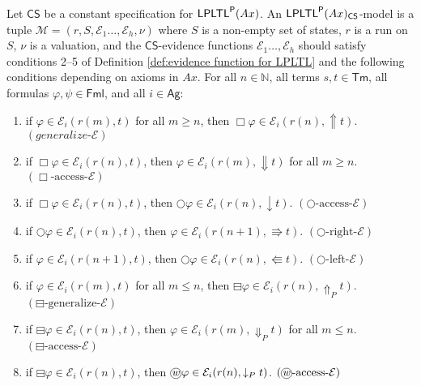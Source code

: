 \documentclass[envcountsect,envcountsame,oribibl,orivec]{llncs}
\newcommand*\circled[1]{\tikz[baseline=(char.base)]{
		\node[shape=circle,draw,inner sep=0.4pt] (char) {#1};}}
\newcommand{\Formulae}{\textsf{Fml}}
\newcommand{\lnext}{\bigcirc}
\newcommand{\lalways}{\Box}
\newcommand{\lsofar}{\boxminus}
\newcommand{\wprevious}{\circled{\textit{w}}}
\newcommand{\LPLTLp}{\textsf{LPLTL}^{\sf P}}
\newcommand{\Terms}{\textsf{Tm}}
\newcommand{\Ag}{\textsf{Ag}}
\newcommand{\tnext}{\Rrightarrow}
\newcommand{\tprev}{\Lleftarrow}
\newcommand{\talwaysaccess}{\Downarrow}
\newcommand{\tgeneralize}{\Uparrow}
\newcommand{\tnextaccess}{\downarrow}
\newcommand{\thenceforthaccess}{\Downarrow_P}
\newcommand{\thenceforthgeneralize}{\Uparrow_P}
\newcommand{\tprevaccess}{\downarrow_P}
\newcommand{\CS}{\textsf{CS}}
\newcommand{\numberofagents}{h}
\newcommand{\agent}{i}
\newcommand{\generalizeevidence}{\ensuremath{(generalize\text{-}\evidence)}}
\newcommand{\alwaysaccessevidence}{\ensuremath{(\lalways\text{-access-}\evidence)}}
\newcommand{\nextaccessevidence}{\ensuremath{(\lnext\text{-access-}\evidence)}}
\newcommand{\nextrightshiftevidence}{\ensuremath{(\lnext\text{-right-}\evidence)}}
\newcommand{\nextleftshiftevidence}{\ensuremath{(\lnext\text{-left-}\evidence)}}
\newcommand{\pastgeneralizeevidence}{\ensuremath{(\lsofar\text{-generalize-}\evidence)}}
\newcommand{\pastaccessevidence}{\ensuremath{(\lsofar\text{-access-}\evidence)}}
\newcommand{\wprevaccessevidence}{\ensuremath{(\wprevious\text{-access-}\evidence)}}
\newcommand{\evidence}{\mathcal{E}}
\newcommand{\valuation}{\nu}
\newcommand{\M}{\mathcal{M}}
\newcommand{\N}{\mathbb{N}}
\renewcommand{\phi}{\varphi}
\begin{document}
\begin{definition}\label{def: evidence functions M-models aditional principles}
Let $\CS$ be a constant specification for $\LPLTLp(Ax)$. An \linebreak $\LPLTLp(Ax)_\CS$-model   is a tuple $
\M = (r, S, \evidence_1\ldots,\evidence_\numberofagents, \valuation)
$
where $S$ is a non-empty set of states, $r$ is a run on $S$, $\valuation$ is a valuation, and the $\CS$-evidence functions $\evidence_1\ldots,\evidence_\numberofagents$ should
	satisfy conditions 2--5 of Definition \ref{def:evidence function for LPLTL} and the following conditions depending on axioms in $Ax$.
	For all $n \in \N$, all terms $s,t \in \Terms$, all formulas $\phi,\psi \in \Formulae$, and all $i \in \Ag$:
	\begin{enumerate}
		\item if $\phi \in \evidence_\agent(r(m), t)$ for all $m \geq n$, then $\lalways \phi \in \evidence_i(r(n), \tgeneralize t)$. \hfill
		$\generalizeevidence$
				
		\item if $\lalways\phi \in \evidence_\agent(r(n),t)$, then $\phi \in \evidence_\agent(r(m), \talwaysaccess t)$ for all $m \geq n$. \hfill $\alwaysaccessevidence$
		
		\item if $\lalways\phi \in \evidence_\agent(r(n),t)$, then $\lnext\phi \in \evidence_\agent(r(n), \tnextaccess t)$.  \hfill $\nextaccessevidence$
			
		\item if $\lnext \phi \in \evidence_\agent(r(n),t)$, then $\phi \in \evidence_\agent(r(n+1), \tnext t)$. 
		\hfill $\nextrightshiftevidence$
		
		\item if $\phi \in \evidence_\agent(r(n+1), t)$, then $\lnext \phi \in \evidence_\agent(r(n), \tprev t)$.
		\hfill $\nextleftshiftevidence$
		
		\vspace*{0.1cm}
		\item if $\phi \in \evidence_\agent(r(m), t)$ for all $m \leq n$, then $\lsofar \phi \in \evidence_i(r(n), \thenceforthgeneralize t)$. \hfill
		$\pastgeneralizeevidence$
		
		\item if $\lsofar \phi \in \evidence_\agent(r(n),t)$, then $\phi \in \evidence_\agent(r(m), \thenceforthaccess t)$ for all $m \leq n$. \hfill $\pastaccessevidence$
		
		\item if $\lsofar \phi \in \evidence_\agent(r(n),t)$, then $\wprevious \phi \in \evidence_\agent(r(n), \tprevaccess t)$.  \hfill $\wprevaccessevidence$
		

\end{enumerate}
\end{definition}
\end{document}
